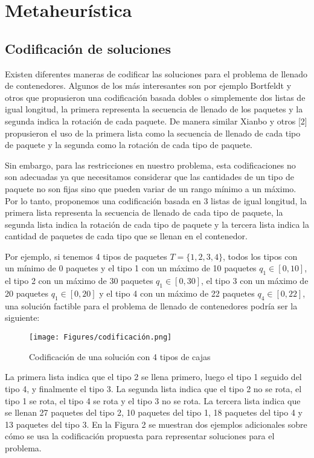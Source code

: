 \section{Metaheurística}

\subsection{Codificación de soluciones}
    
Existen diferentes maneras de codificar las soluciones para el problema de llenado de contenedores. Algunos de los más interesantes son por ejemplo Bortfeldt y otros \cite{baez/article} que propusieron una codificación basada dobles o simplemente dos listas de igual longitud, la primera representa la secuencia de llenado de los paquetes y la segunda indica la rotación de cada paquete. De manera similar Xianbo y otros [2] propusieron el uso de la primera lista como la secuencia de llenado de cada tipo de paquete y la segunda como la rotación de cada tipo de paquete.

Sin embargo, para las restricciones en nuestro problema, esta codificaciones no son adecuadas ya que necesitamos considerar que las cantidades de un tipo de paquete no son fijas sino que pueden variar de un rango mínimo a un máximo. Por lo tanto, proponemos una codificación basada en 3 listas de igual longitud, la primera lista representa la secuencia de llenado de cada tipo de paquete, la segunda lista indica la rotación de cada tipo de paquete y la tercera lista indica la cantidad de paquetes de cada tipo que se llenan en el contenedor.


Por ejemplo, si tenemos 4 tipos de paquetes $T=\{1,2,3,4\}$, todos los tipos con un mínimo de 0 paquetes y el tipo 1 con un máximo de 10 paquetes $q_1 \in [0,10]$, el tipo 2 con un máximo de 30 paquetes $q_1 \in [0,30]$, el tipo 3 con un máximo de 20 paquetes $q_1 \in [0,20]$ y el tipo 4 con un máximo de 22 paquetes $q_4 \in [0,22]$, una solución factible para el problema de llenado de contenedores podría ser la siguiente:

\begin{figure}[H]
    \centering
    \texttt{[image: Figures/codificación.png]}
    \caption{Codificación de una solución con 4 tipos de cajas}
    \label{fig:codificación}
\end{figure}

La primera lista indica que el tipo 2 se llena primero, luego el tipo 1 seguido del tipo 4, y finalmente el tipo 3. La segunda lista indica que el tipo 2 no se rota, el tipo 1 se rota, el tipo 4 se rota y el tipo 3 no se rota. La tercera lista indica que se llenan 27 paquetes del tipo 2, 10 paquetes del tipo 1, 18 paquetes del tipo 4 y 13 paquetes del tipo 3. En la Figura 2 se muestran dos ejemplos adicionales sobre cómo se usa la codificación propuesta para representar soluciones para el problema.

